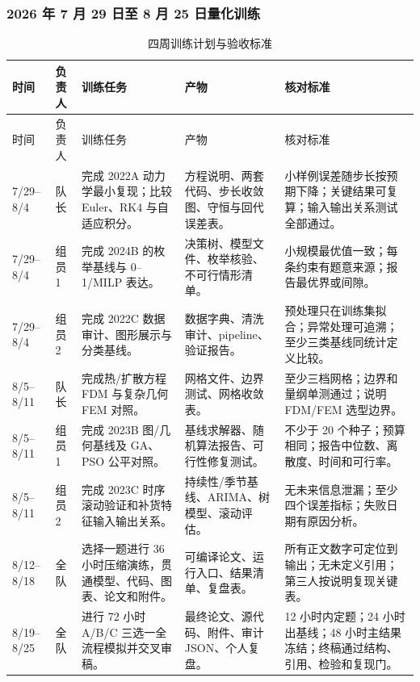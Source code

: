 \subsubsection{2026 年 7 月 29 日至 8 月 25 日量化训练}

\begin{longtable}{p{1.4cm}p{1.55cm}p{3.1cm}p{4.6cm}p{3.4cm}}
\caption{四周训练计划与验收标准}\label{tab:four-weeks}\\
\toprule
时间 & 负责人 & 训练任务 & 产物 & 核对标准\\
\midrule
\endfirsthead
\toprule
时间 & 负责人 & 训练任务 & 产物 & 核对标准\\
\midrule
\endhead
7/29--8/4 & 队长 & 完成 2022A 动力学最小复现；比较 Euler、RK4 与自适应积分。 & 方程说明、两套代码、步长收敛图、守恒与回代误差表。 & 小样例误差随步长按预期下降；关键结果可复算；输入输出关系测试全部通过。\\
7/29--8/4 & 组员1 & 完成 2024B 的枚举基线与 0--1/MILP 表达。 & 决策树、模型文件、枚举核验、不可行情形清单。 & 小规模最优值一致；每条约束有题意来源；报告最优界或间隙。\\
7/29--8/4 & 组员2 & 完成 2022C 数据审计、图形展示与分类基线。 & 数据字典、清洗审计、pipeline、验证报告。 & 预处理只在训练集拟合；异常处理可追溯；至少三类基线同统计定义比较。\\
8/5--8/11 & 队长 & 完成热/扩散方程 FDM 与复杂几何 FEM 对照。 & 网格文件、边界测试、网格收敛表。 & 至少三档网格；边界和量纲单测通过；说明 FDM/FEM 选型边界。\\
8/5--8/11 & 组员1 & 完成 2023B 图/几何基线及 GA、PSO 公平对照。 & 基线求解器、随机算法报告、可行性修复测试。 & 不少于 20 个种子；预算相同；报告中位数、离散度、时间和可行率。\\
8/5--8/11 & 组员2 & 完成 2023C 时序滚动验证和补货特征输入输出关系。 & 持续性/季节基线、ARIMA、树模型、滚动评估。 & 无未来信息泄漏；至少四个误差指标；失败日期有原因分析。\\
8/12--8/18 & 全队 & 选择一题进行 36 小时压缩演练，贯通模型、代码、图表、论文和附件。 & 可编译论文、运行入口、结果清单、复盘表。 & 所有正文数字可定位到输出；无未定义引用；第三人按说明复现关键表。\\
8/19--8/25 & 全队 & 进行 72 小时 A/B/C 三选一全流程模拟并交叉审稿。 & 最终论文、源代码、附件、审计 JSON、个人复盘。 & 12 小时内定题；24 小时出基线；48 小时主结果冻结；终稿通过结构、引用、检验和复现门。\\
\bottomrule
\end{longtable}

